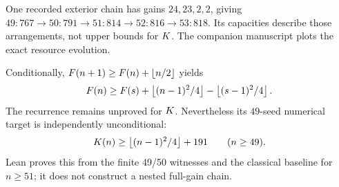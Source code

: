 One recorded exterior chain has gains $24,23,2,2$, giving
$49{:}767\to50{:}791\to51{:}814\to52{:}816\to53{:}818$.
Its capacities describe those arrangements, not upper bounds for $K$.
The companion manuscript plots the exact resource evolution.


Conditionally, $F(n+1)\ge F(n)+\left\lfloor n/2\right\rfloor$ yields
\[
 F(n)\ge F(s)+\left\lfloor(n-1)^2/4\right\rfloor-\left\lfloor(s-1)^2/4\right\rfloor.
\]
The recurrence remains unproved for $K$.  Nevertheless its $49$-seed
numerical target is independently unconditional:
\begin{equation}
 K(n)\ge\left\lfloor(n-1)^2/4\right\rfloor+191\qquad(n\ge49).
 \label{jext:49}
\end{equation}
Lean proves this from the finite 49/50 witnesses and the classical
baseline for $n\ge51$; it does not construct a nested full-gain chain.
